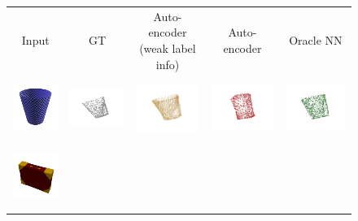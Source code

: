 \documentclass[bachelor, nocolorlinks, printoneside]{seuthesis} %
\begin{document}
\begin{Main}
\begin{figure}[!h]
    \begin{tabular}{c@{}c@{}c@{}c@{}c@{}}
    Input & GT & \makecell[c]{Auto-encoder \\(weak label info)} & Auto-encoder & Oracle NN\\
    	\includegraphics[width=0.11\columnwidth,height=2cm]{figs/real_dataset/Image/ashcan_ff2f13bc0b9d4ade19c52ba9902b5ab0.png} &
    	\includegraphics[width=0.22\columnwidth,height=2cm]{figs/real_dataset/GT/ashcan_ff2f13bc0b9d4ade19c52ba9902b5ab0_gt.png} &
    	\includegraphics[width=0.22\columnwidth,height=2cm]{figs/real_dataset/AE_label/ashcan_ff2f13bc0b9d4ade19c52ba9902b5ab0_fine.png} &
    	\includegraphics[width=0.22\columnwidth,height=2cm]{figs/real_dataset/AE/ashcan_66d96d2428184442ba6cf6cbb9f4c2bb_fine.png} &
    	\includegraphics[width=0.22\columnwidth,height=2cm]{figs/real_dataset/oracle/ashcan_ff2f13bc0b9d4ade19c52ba9902b5ab0_oracle.png} \\
    	\vspace{-5mm}
    	\includegraphics[width=0.11\columnwidth,height=2cm]{figs/real_dataset/Image/bag_8569a0c606bbba73d9985ad45fbb635e.png} &

\end{tabular}
\end{figure}
\end{Main}
\end{document}
